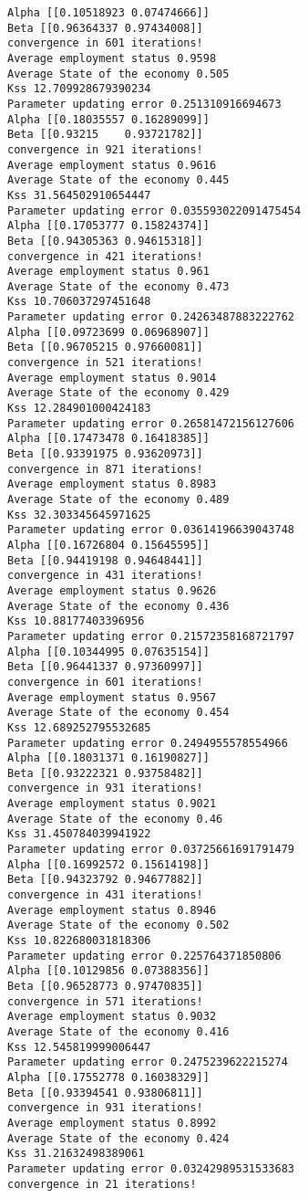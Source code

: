 \documentclass[11pt]{article}
\begin{document}
\begin{Verbatim}[commandchars=\\\{\}]
Alpha [[0.10518923 0.07474666]]
Beta [[0.96364337 0.97434008]]
convergence in 601 iterations!
Average employment status 0.9598
Average State of the economy 0.505
Kss 12.709928679390234
Parameter updating error 0.251310916694673
Alpha [[0.18035557 0.16289099]]
Beta [[0.93215    0.93721782]]
convergence in 921 iterations!
Average employment status 0.9616
Average State of the economy 0.445
Kss 31.564502910654447
Parameter updating error 0.035593022091475454
Alpha [[0.17053777 0.15824374]]
Beta [[0.94305363 0.94615318]]
convergence in 421 iterations!
Average employment status 0.961
Average State of the economy 0.473
Kss 10.706037297451648
Parameter updating error 0.24263487883222762
Alpha [[0.09723699 0.06968907]]
Beta [[0.96705215 0.97660081]]
convergence in 521 iterations!
Average employment status 0.9014
Average State of the economy 0.429
Kss 12.284901000424183
Parameter updating error 0.26581472156127606
Alpha [[0.17473478 0.16418385]]
Beta [[0.93391975 0.93620973]]
convergence in 871 iterations!
Average employment status 0.8983
Average State of the economy 0.489
Kss 32.303345645971625
Parameter updating error 0.03614196639043748
Alpha [[0.16726804 0.15645595]]
Beta [[0.94419198 0.94648441]]
convergence in 431 iterations!
Average employment status 0.9626
Average State of the economy 0.436
Kss 10.88177403396956
Parameter updating error 0.21572358168721797
Alpha [[0.10344995 0.07635154]]
Beta [[0.96441337 0.97360997]]
convergence in 601 iterations!
Average employment status 0.9567
Average State of the economy 0.454
Kss 12.689252795532685
Parameter updating error 0.2494955578554966
Alpha [[0.18031371 0.16190827]]
Beta [[0.93222321 0.93758482]]
convergence in 931 iterations!
Average employment status 0.9021
Average State of the economy 0.46
Kss 31.450784039941922
Parameter updating error 0.03725661691791479
Alpha [[0.16992572 0.15614198]]
Beta [[0.94323792 0.94677882]]
convergence in 431 iterations!
Average employment status 0.8946
Average State of the economy 0.502
Kss 10.822680031818306
Parameter updating error 0.225764371850806
Alpha [[0.10129856 0.07388356]]
Beta [[0.96528773 0.97470835]]
convergence in 571 iterations!
Average employment status 0.9032
Average State of the economy 0.416
Kss 12.545819999006447
Parameter updating error 0.2475239622215274
Alpha [[0.17552778 0.16038329]]
Beta [[0.93394541 0.93806811]]
convergence in 931 iterations!
Average employment status 0.8992
Average State of the economy 0.424
Kss 31.21632498389061
Parameter updating error 0.03242989531533683
convergence in 21 iterations!
    \end{Verbatim}
\end{document}
